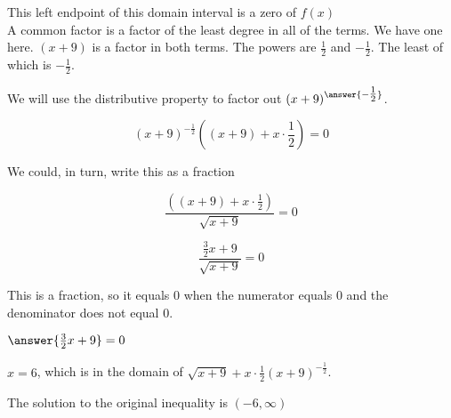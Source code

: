 \documentclass{ximera}
\begin{document}
\begin{example}
\begin{explanation}
This left endpoint of this domain interval is a zero of $f(x)$ \\ 






A common factor is a factor of the least degree in all of the terms.  We have one here. $(x+9)$ is a factor in both terms.  The powers are $\frac{1}{2}$ and $-\frac{1}{2}$. The least of which is $-\frac{1}{2}$.

We will use the distributive property to factor out $(x+9)^{\answer{-\tfrac{1}{2}}}$.


\[ (x+9)^{-\tfrac{1}{2}} \left((x+9) + x \cdot \frac{1}{2}\right)  = 0 \]


We could, in turn, write this as a fraction


\[ \frac{\left((x+9) + x \cdot \frac{1}{2}\right)}{\sqrt{x+9}} = 0 \]


\[ \frac{ \frac{3}{2} x + 9}{\sqrt{x+9}} = 0 \]



This is a fraction, so it equals $0$ when the numerator equals $0$ and the denominator does not equal $0$.


$\answer{\frac{3}{2} x + 9} = 0$



$x = 6$, which is in the domain of $\sqrt{x+9} + x \cdot \frac{1}{2} (x+9)^{-\tfrac{1}{2}}$.



The solution to the original inequality is $(-6, \infty)$


\end{explanation}

\end{example}
\end{document}
